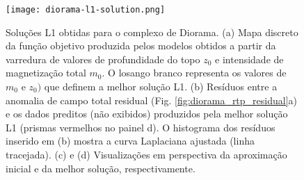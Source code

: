 \pagebreak
\begin{figure}[!htb]
	\texttt{[image: diorama-l1-solution.png]}
	\caption{Soluções L1 obtidas para o complexo de Diorama. 
		(a) Mapa discreto da função objetivo produzida pelos modelos obtidos a partir da varredura de valores de profundidade do topo $z_{0}$ e intensidade de magnetização total $m_{0}$. 
		O losango branco representa os valores de $m_{0}$ e $z_{0})$ que definem a melhor solução L1.
		(b) Resíduos entre a anomalia de campo total residual (Fig. \ref{fig:diorama_rtp_residual}a) e os dados preditos (não exibidos) produzidos pela melhor solução L1 (prismas vermelhos no painel d). 
		O histograma dos resíduos inserido em (b) mostra a curva
		Laplaciana ajustada (linha tracejada). 
		(c) e (d) Visualizações em perspectiva da aproximação inicial e da melhor solução, respectivamente.
	}
	\label{fig:diorama_l1_result}
\end{figure}